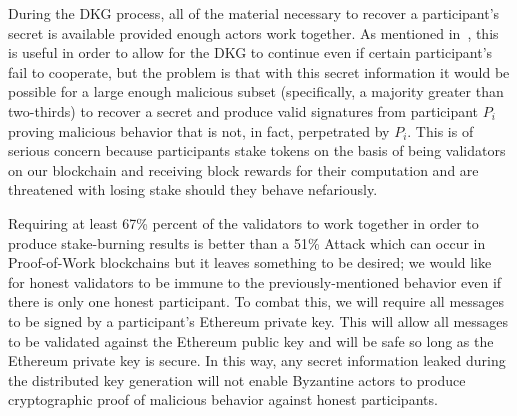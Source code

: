During the DKG process, all of the material necessary
to recover a participant's secret is available provided
enough actors work together.
As mentioned in~\cite{ethdkg}, this is useful in order to allow
for the DKG to continue even if certain participant's fail to cooperate,
but the problem is that with this secret information it would
be possible for a large enough malicious subset (specifically,
a majority greater than two-thirds) to recover a secret
and produce valid signatures from participant $P_{i}$
proving malicious behavior that is not, in fact, perpetrated by $P_{i}$.
This is of serious concern because participants
stake tokens on the basis of being validators
on our blockchain and receiving block rewards for their computation
and are threatened with losing stake should they
behave nefariously.

Requiring at least 67\% percent of the validators to work together
in order to produce stake-burning results is
better than a 51\% Attack which can occur
in Proof-of-Work blockchains but it leaves something to be desired;
we would like for honest validators to be immune to
the previously-mentioned behavior even if there is only
one honest participant.
To combat this, we will require all messages to be signed
by a participant's Ethereum private key.
This will allow all messages to be validated against the Ethereum
public key and will be safe so long as the Ethereum private key
is secure.
In this way, any secret information leaked during the distributed
key generation will not enable Byzantine actors to produce
cryptographic proof of malicious behavior against honest participants.

